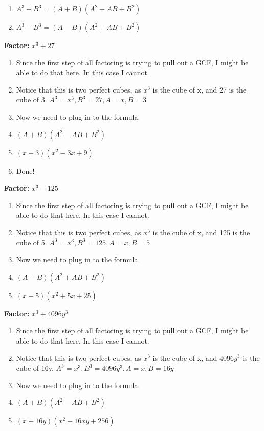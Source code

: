 \documentclass{article}
\begin{document}
\begin{enumerate}
\item [] $A^{3}+B^{3} = (A+B)(A^{2}-AB+B^{2})$
\item [] $A^{3}-B^{3} = (A-B)(A^{2}+AB+B^{2})$
\end{enumerate}
\textbf{Factor:} $x^{3} + 27$\\
\begin{enumerate}
\item Since the first step of all factoring is trying to pull out a GCF, I might be able to do that here. In this case I cannot.
\item Notice that this is two perfect cubes, as $x^{3}$ is the cube of x, and 27 is the cube of 3. $A^{3}=x^{3}, B^{3}=27, A=x, B=3$
\item Now we need to plug in to the formula.
\item [] $(A+B)(A^{2}-AB+B^{2})$
\item [] $(x+3)(x^{2}-3x+9)$
\item Done!
\end{enumerate}
\textbf{Factor:} $x^{3} - 125$\\
\begin{enumerate}
\item Since the first step of all factoring is trying to pull out a GCF, I might be able to do that here. In this case I cannot.
\item Notice that this is two perfect cubes, as $x^{3}$ is the cube of x, and 125 is the cube of 5. $A^{3}=x^{3}, B^{3}=125, A=x, B=5$
\item Now we need to plug in to the formula.
\item [] $(A-B)(A^{2}+AB+B^{2})$
\item [] $(x-5)(x^{2}+5x+25)$
\end{enumerate}
\textbf{Factor:} $x^{3} + 4096y^{3}$\\
\begin{enumerate}
\item Since the first step of all factoring is trying to pull out a GCF, I might be able to do that here. In this case I cannot.
\item Notice that this is two perfect cubes, as $x^{3}$ is the cube of x, and $4096y^{3}$ is the cube of 16y. $A^{3}=x^{3}, B^{3}=4096y^{3}, A=x, B=16y$
\item Now we need to plug in to the formula.
\item [] $(A+B)(A^{2}-AB+B^{2})$
\item [] $(x+16y)(x^{2}-16xy+256)$
\end{enumerate}
\end{document}
